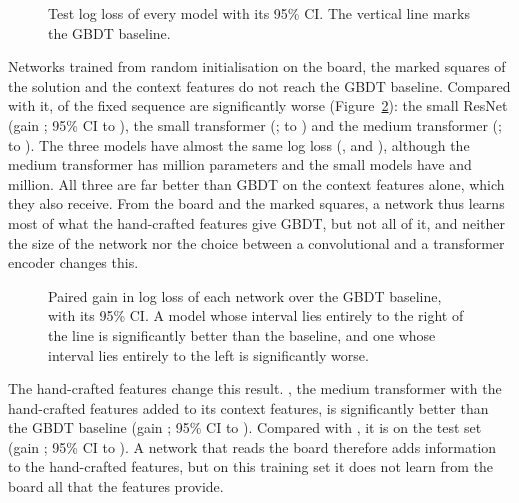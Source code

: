 \documentclass[11pt]{article}
\begin{document}
\begin{figure}[htbp]\centering
{}
\caption{Test log loss of every model with its 95\% CI. The vertical line
marks the GBDT baseline.}
\label{fig:scores}
\end{figure}

Networks trained from random initialisation on the board, the marked squares
of the solution and the context features do not reach the GBDT baseline.
Compared with it,  of the fixed sequence are
significantly worse (Figure~\ref{fig:gains}): the small ResNet (gain
; 95\% CI  to
), the small transformer
(;  to
) and the medium transformer
(;  to
). The three models have almost the same
log loss (,  and
), although the medium transformer has
 million parameters and the
small models have  and
 million. All three are far
better than GBDT on the context features alone, which they also receive. From
the board and the marked squares, a network thus learns most of what the
hand-crafted features give GBDT, but not all of it, and neither the size of
the network nor the choice between a convolutional and a transformer encoder
changes this.

\begin{figure}[htbp]\centering
{}
\caption{Paired gain in log loss of each network over the GBDT baseline, with
its 95\% CI. A model whose interval lies entirely to the right of the line is
significantly better than the baseline, and one whose interval lies entirely
to the left is significantly worse.}
\label{fig:gains}
\end{figure}

The hand-crafted features change this result. ,
the medium transformer with the hand-crafted features added to its context
features, is significantly better than the GBDT baseline (gain
; 95\% CI
 to
).
\ifpairs
Compared with , it is
 on the test set
(gain ; 95\% CI
 to
).
\fi
A network that reads the board therefore adds information to the hand-crafted
features, but on this training set it does not learn from the board all that
the features provide.
\end{document}
